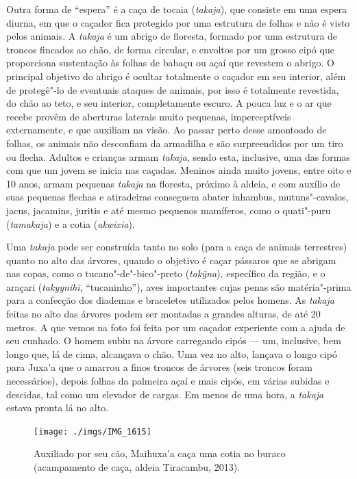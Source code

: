 Outra forma de ``espera'' é a caça de tocaia (\emph{takaja}), que consiste
em uma espera diurna, em que o caçador fica protegido por uma estrutura
de folhas e não é visto pelos animais. A \emph{takaja} é um abrigo de
floresta, formado por uma estrutura de troncos fincados ao chão, de
forma circular, e envoltos por um grosso cipó que proporciona
sustentação às folhas de babaçu ou açaí que revestem o abrigo. O
principal objetivo do abrigo é ocultar totalmente o caçador em seu
interior, além de protegê"-lo de eventuais ataques de animais, por isso é
totalmente revestida, do chão ao teto, e seu interior, completamente
escuro. A pouca luz e o ar que recebe provêm de aberturas laterais muito
pequenas, imperceptíveis externamente, e que auxiliam na visão. Ao
passar perto desse amontoado de folhas, os animais não desconfiam da
armadilha e são surpreendidos por um tiro ou flecha. Adultos e crianças
armam \emph{takaja}, sendo esta, inclusive, uma das formas com que um
jovem se inicia nas caçadas. Meninos ainda muito jovens, entre oito e 10
anos, armam pequenas \emph{takaja} na floresta, próximo à aldeia, e com
auxílio de suas pequenas flechas e atiradeiras conseguem abater
inhambus, mutuns"-cavalos, jacus, jacamins, juritis e até mesmo pequenos
mamíferos, como o quati"-puru (\emph{tamakaja}) e a cotia
(\emph{akwixia}).

Uma \emph{takaja} pode ser construída tanto no solo (para a caça de
animais terrestres) quanto no alto das árvores, quando o objetivo é
caçar pássaros que se abrigam nas copas, como o tucano"-de"-bico"-preto
(\emph{takỹna}), específico da região, e o araçari (\emph{takyynihĩ},
``tucaninho''), aves importantes cujas penas são matéria"-prima para a
confecção dos diademas e braceletes utilizados pelos homens. As
\emph{takaja} feitas no alto das árvores podem ser montadas a grandes
alturas, de até 20 metros. A que vemos na foto foi feita por um caçador
experiente com a ajuda de seu cunhado. O homem subiu na árvore
carregando cipós --- um, inclusive, bem longo que, lá de cima, alcançava o
chão. Uma vez no alto, lançava o longo cipó para Juxa'a que o amarrou a
finos troncos de árvores (seis troncos foram necessários), depois folhas
da palmeira açaí e mais cipós, em várias subidas e descidas, tal como um
elevador de cargas. Em menos de uma hora, a \emph{takaja} estava pronta
lá no alto.

\begin{figure}[H]
\centering
  \texttt{[image: ./imgs/IMG\_1615]}
\caption{Auxiliado por seu cão, Maihuxa’a caça uma cotia no buraco (acampamento de caça, aldeia Tiracambu, 2013).}
\end{figure}

